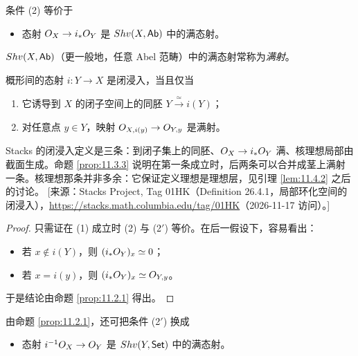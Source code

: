 \begin{remark}\label{rem:11.3.2}
条件 (2) 等价于
\begin{itemize}[leftmargin=3.2em,itemsep=0.25ex]
  \item[(2Ab)] 态射 $O_X \to i_*O_Y$ 是 $Shv(X,\mathsf{Ab})$ 中的满态射。
\end{itemize}
$Shv(X,\mathsf{Ab})$（更一般地，任意 Abel 范畴）中的满态射常称为\emph{满射}。
\end{remark}

\begin{proposition}\label{prop:11.3.3}
概形间的态射 $i \colon Y \to X$ 是闭浸入，当且仅当
\begin{enumerate}[label=(\arabic*),leftmargin=2em,itemsep=0.25ex]
  \item 它诱导到 $X$ 的闭子空间上的同胚 $Y \xrightarrow{\ \simeq\ } i(Y)$；
  \item[(2$'$)] 对任意点 $y \in Y$，映射 $O_{X,i(y)} \to O_{Y,y}$ 是满射。
\end{enumerate}
\end{proposition}

\begin{yizhu}
Stacks 的闭浸入定义是三条：到闭子集上的同胚、$O_X \to i_*O_Y$ 满、核理想局部由截面生成。命题 \ref{prop:11.3.3} 说明在第一条成立时，后两条可以合并成茎上满射一条。核理想那条并非多余：它保证定义理想是理想层，见引理 \ref{lem:11.4.2} 之后的讨论。
[来源：Stacks Project, Tag 01HK（Definition 26.4.1，局部环化空间的闭浸入），\url{https://stacks.math.columbia.edu/tag/01HK}（2026-11-17 访问）。]
\end{yizhu}

\begin{proof}
只需证在 (1) 成立时 (2) 与 (2$'$) 等价。在后一假设下，容易看出：
\begin{itemize}[leftmargin=2em,itemsep=0.25ex]
  \item 若 $x \notin i(Y)$，则 $(i_*O_Y)_x \simeq 0$；
  \item 若 $x = i(y)$，则 $(i_*O_Y)_x \simeq O_{Y,y}$。
\end{itemize}
于是结论由命题 \ref{prop:11.2.1} 得出。
\end{proof}

\begin{remark}\label{rem:11.3.4}
由命题 \ref{prop:11.2.1}，还可把条件 (2$'$) 换成
\begin{itemize}[leftmargin=3.2em,itemsep=0.25ex]
  \item[(2$''$)] 态射 $i^{-1}O_X \to O_Y$ 是 $Shv(Y,\mathsf{Set})$ 中的满态射。
\end{itemize}
\end{remark}

